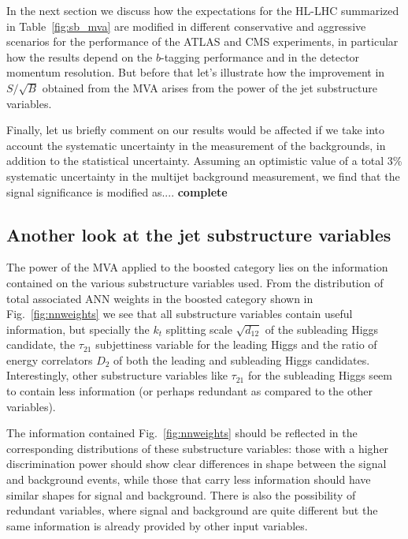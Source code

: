 In the next section we discuss how the expectations for the HL-LHC
summarized in  Table~\ref{fig:sb_mva} are modified in different
conservative and aggressive scenarios for the performance of the
ATLAS and CMS experiments, in particular how the results depend
on the $b$-tagging performance and in the detector momentum
resolution.
%
But before that let's illustrate how the improvement in $S/\sqrt{B}$
obtained from the MVA arises from the power of the jet
substructure variables.

Finally, let us briefly comment on our results would be affected
if we take into account the systematic uncertainty in the measurement
of the backgrounds, in addition to the statistical uncertainty.
%
Assuming an optimistic value of a total 3\% systematic uncertainty in the
multijet background measurement, we find that the signal significance is
modified as....
{\bf complete}

\subsection{Another look at the jet substructure variables}

The power of the MVA applied to the boosted category lies
on the information contained on the various substructure variables
used.
%
From the distribution of total associated ANN weights in the
boosted category shown in Fig.~\ref{fig:nnweights} we see that
all substructure variables contain useful information,
but specially the $k_t$ splitting scale $\sqrt{d_{12}}$ of the
subleading Higgs candidate, the $\tau_{21}$ subjettiness variable for
the leading Higgs
and the ratio of energy correlators $D_2$ of both the leading
and subleading Higgs candidates.
%
Interestingly, other substructure variables like $\tau_{21}$ for
the subleading Higgs seem to contain less information (or perhaps
redundant as compared to the other variables).


The information contained Fig.~\ref{fig:nnweights} should be
reflected in the corresponding distributions of these substructure
variables: those with a higher discrimination power should show
clear differences in shape between the signal and background events,
while those that carry less information should have similar
shapes for signal and background.
%
There is also the possibility of redundant variables, where signal
and background are quite different but the same information
is already provided by other input variables.


